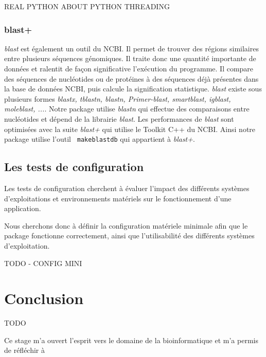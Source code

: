 \documentclass[twoside,a4paper,11pt,frenchb,openany]{report}
\begin{document}
REAL PYTHON ABOUT PYTHON THREADING




\subsection{blast+}

\textit{blast} est également un outil du NCBI. Il permet de trouver des régions similaires entre plusieurs séquences génomiques. Il traite donc une quantité importante de données et ralentit de façon significative l'exécution du programme. Il compare des séquences de nucléotides ou de protéines à des séquences déjà présentes dans la base de données NCBI, puis calcule la signification statistique. \textit{blast} existe sous plusieurs formes \textit{blastx, tblastn, blastn, Primer-blast, smartblast, igblast, moleblast, ...}. Notre package utilise \textit{blastn} qui effectue des comparaisons entre nucléotides et dépend de la librairie \textit{blast}. Les performances de \textit{blast} sont optimisées avec la suite \textit{blast+} qui utilise le Toolkit C++ du NCBI. Ainsi notre package utilise l'outil \texttt{  makeblastdb} qui appartient à \textit{blast+}.






\section{Les tests de configuration}

Les tests de configuration cherchent à évaluer l'impact des différents systèmes d'exploitations et environnements matériels sur le fonctionnement d'une application.

Nous cherchons donc à définir la configuration matériele minimale afin que le package fonctionne correctement, ainsi que l'utilisabilité des différents systèmes d'exploitation.

TODO - CONFIG MINI






\chapter{Conclusion}

TODO

Ce stage m'a ouvert l'esprit vers le domaine de la bioinformatique et m'a permis de réfléchir à 
\end{document}
